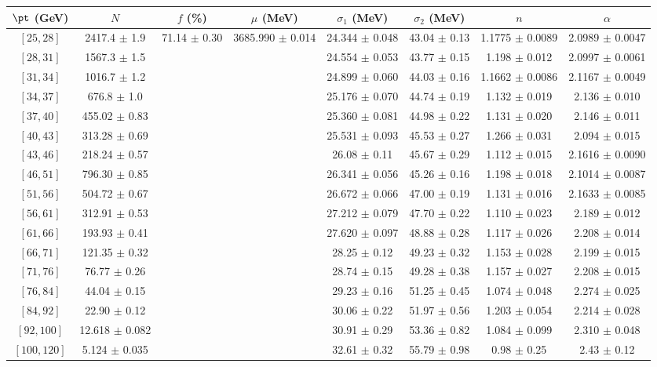 \begin{tabular}{c||c|c|c|c|c|c|c}
$\pt$ (GeV) & $N$ & $f$ (\%) & $\mu$ (MeV) & $\sigma_1$ (MeV) & $\sigma_2$ (MeV) & $n$ & $\alpha$ \\
\hline
$[25, 28]$ & 2417.4 $\pm$ 1.9 & \multirow{17}{*}{71.14 $\pm$ 0.30} & \multirow{17}{*}{3685.990 $\pm$ 0.014} & 24.344 $\pm$ 0.048 & 43.04 $\pm$ 0.13 & 1.1775 $\pm$ 0.0089 & 2.0989 $\pm$ 0.0047\\
$[28, 31]$ & 1567.3 $\pm$ 1.5 &  &  & 24.554 $\pm$ 0.053 & 43.77 $\pm$ 0.15 & 1.198 $\pm$ 0.012 & 2.0997 $\pm$ 0.0061\\
$[31, 34]$ & 1016.7 $\pm$ 1.2 &  &  & 24.899 $\pm$ 0.060 & 44.03 $\pm$ 0.16 & 1.1662 $\pm$ 0.0086 & 2.1167 $\pm$ 0.0049\\
$[34, 37]$ & 676.8 $\pm$ 1.0 &  &  & 25.176 $\pm$ 0.070 & 44.74 $\pm$ 0.19 & 1.132 $\pm$ 0.019 & 2.136 $\pm$ 0.010\\
$[37, 40]$ & 455.02 $\pm$ 0.83 &  &  & 25.360 $\pm$ 0.081 & 44.98 $\pm$ 0.22 & 1.131 $\pm$ 0.020 & 2.146 $\pm$ 0.011\\
$[40, 43]$ & 313.28 $\pm$ 0.69 &  &  & 25.531 $\pm$ 0.093 & 45.53 $\pm$ 0.27 & 1.266 $\pm$ 0.031 & 2.094 $\pm$ 0.015\\
$[43, 46]$ & 218.24 $\pm$ 0.57 &  &  & 26.08 $\pm$ 0.11 & 45.67 $\pm$ 0.29 & 1.112 $\pm$ 0.015 & 2.1616 $\pm$ 0.0090\\
$[46, 51]$ & 796.30 $\pm$ 0.85 &  &  & 26.341 $\pm$ 0.056 & 45.26 $\pm$ 0.16 & 1.198 $\pm$ 0.018 & 2.1014 $\pm$ 0.0087\\
$[51, 56]$ & 504.72 $\pm$ 0.67 &  &  & 26.672 $\pm$ 0.066 & 47.00 $\pm$ 0.19 & 1.131 $\pm$ 0.016 & 2.1633 $\pm$ 0.0085\\
$[56, 61]$ & 312.91 $\pm$ 0.53 &  &  & 27.212 $\pm$ 0.079 & 47.70 $\pm$ 0.22 & 1.110 $\pm$ 0.023 & 2.189 $\pm$ 0.012\\
$[61, 66]$ & 193.93 $\pm$ 0.41 &  &  & 27.620 $\pm$ 0.097 & 48.88 $\pm$ 0.28 & 1.117 $\pm$ 0.026 & 2.208 $\pm$ 0.014\\
$[66, 71]$ & 121.35 $\pm$ 0.32 &  &  & 28.25 $\pm$ 0.12 & 49.23 $\pm$ 0.32 & 1.153 $\pm$ 0.028 & 2.199 $\pm$ 0.015\\
$[71, 76]$ & 76.77 $\pm$ 0.26 &  &  & 28.74 $\pm$ 0.15 & 49.28 $\pm$ 0.38 & 1.157 $\pm$ 0.027 & 2.208 $\pm$ 0.015\\
$[76, 84]$ & 44.04 $\pm$ 0.15 &  &  & 29.23 $\pm$ 0.16 & 51.25 $\pm$ 0.45 & 1.074 $\pm$ 0.048 & 2.274 $\pm$ 0.025\\
$[84, 92]$ & 22.90 $\pm$ 0.12 &  &  & 30.06 $\pm$ 0.22 & 51.97 $\pm$ 0.56 & 1.203 $\pm$ 0.054 & 2.214 $\pm$ 0.028\\
$[92, 100]$ & 12.618 $\pm$ 0.082 &  &  & 30.91 $\pm$ 0.29 & 53.36 $\pm$ 0.82 & 1.084 $\pm$ 0.099 & 2.310 $\pm$ 0.048\\
$[100, 120]$ & 5.124 $\pm$ 0.035 &  &  & 32.61 $\pm$ 0.32 & 55.79 $\pm$ 0.98 & 0.98 $\pm$ 0.25 & 2.43 $\pm$ 0.12\\
\end{tabular}
